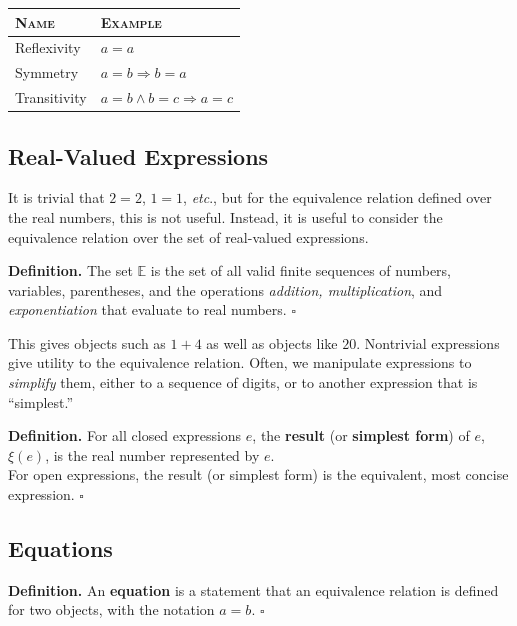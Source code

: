 \documentclass[letterpaper,twoside]{article}
\def\SmallHSpace{\hspace*{1mm}}
\newcommand{\DefinedTerm}[1]{\textbf{#1}}
\newcommand{\Definition}[1]{%
    \emoji{book} \textbf{Definition.}\SmallHSpace #1 \hfill $\square$
}
\begin{document}
\begin{table}[H]
    \centering
    \doublespacing
    \setlength\tabcolsep{0pt}
    \begin{tabular*}{0.333\linewidth}{@{\extracolsep{\fill}} ll}
        \textsc{Name} & \textsc{Example} \\
        \hline
        Reflexivity & $a = a$ \\
        Symmetry  & $a=b \Longrightarrow b = a$ \\
        Transitivity  & $a=b \land b=c \Longrightarrow a = c$ \\
    \end{tabular*}
    \normalsize
\end{table}
\begin{multicols}{2}

\subsection{Real-Valued Expressions}

It is trivial that $2 = 2$, $1 = 1$, \textit{etc}., but for the equivalence relation defined over the real numbers, this is not useful.
Instead, it is useful to consider the equivalence relation over the set of real-valued expressions.

\Definition
{
    The set $\mathbb{E}$ is the set of all valid finite sequences of numbers, variables, parentheses, and the operations \textit{addition, multiplication}, and \textit{exponentiation} that evaluate to real numbers.
}

This gives objects such as $1 + 4$ as well as objects like $20$.
Nontrivial expressions give utility to the equivalence relation.
Often, we manipulate expressions to \textit{simplify} them, either to a sequence of digits, or to another expression that is ``simplest.''

\Definition
{
    For all closed expressions $e$, the \DefinedTerm{result} (or \DefinedTerm{simplest form}) of $e$, $\xi(e)$, is the real number represented by $e$.
    \\
    For open expressions, the result (or simplest form) is the equivalent, most concise expression.
}

\subsection{Equations}

\Definition
{
    An \DefinedTerm{equation} is a statement that an equivalence relation is defined for two objects, with the notation $a = b$.
}


\end{multicols}
\end{document}
